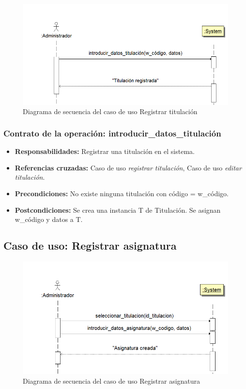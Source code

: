 \documentclass{book}
\begin{document}
\begin{figure}[H] 
  \label{comportamiento-reg-titulacion} 
	\begin{center}
    \includegraphics[scale=0.5]{./secuencia-reg-titulacion.png}
  \end{center}
\caption{Diagrama de secuencia del caso de uso Registrar titulación}
\end{figure}

\subsubsection{Contrato de la operación: introducir\_datos\_titulación}
\begin{itemize}
\item {\bf Responsabilidades:} Registrar una titulación en el sistema.
\item {\bf Referencias cruzadas:} Caso de uso {\em registrar titulación}, Caso de uso {\em editar titulación}.
\item {\bf Precondiciones:} No existe ninguna titulación con código = w\_código.
\item {\bf Postcondiciones:} Se crea una instancia T de Titulación. Se asignan w\_código y datos a T.
\end{itemize}

\subsection{Caso de uso: Registrar asignatura}

\begin{figure}[H] 
  \label{comportamiento-reg-asignatura} 
	\begin{center}
    \includegraphics[scale=0.5]{./secuencia-reg-asignatura.png}
  \end{center}
\caption{Diagrama de secuencia del caso de uso Registrar asignatura}
\end{figure}
\end{document}
